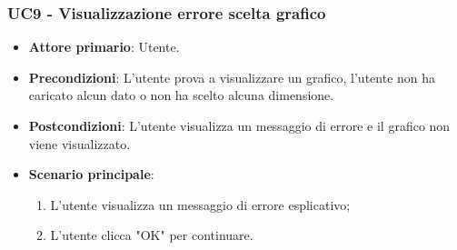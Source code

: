 \subsubsection{UC9 - Visualizzazione errore scelta grafico}
\begin{itemize}
	\item \textbf{Attore primario}: Utente.
	\item \textbf{Precondizioni}: L'utente prova a visualizzare un grafico, l'utente non ha caricato alcun dato o non ha scelto alcuna dimensione.
	\item \textbf{Postcondizioni}: L'utente visualizza un messaggio di errore e il grafico non viene visualizzato.
	\item \textbf{Scenario principale}:
		\begin{enumerate}
			\item L'utente visualizza un messaggio di errore esplicativo;
			\item L'utente clicca "OK" per continuare.
		\end{enumerate}
\end{itemize}
